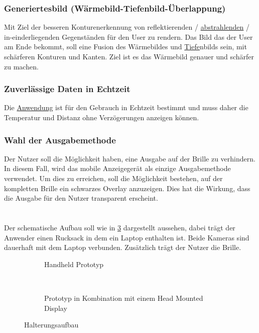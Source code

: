\subsubsection{Generiertesbild (Wärmebild-Tiefenbild-Überlappung)}
Mit Ziel der besseren Konturenerkennung von reflektierenden / \hyperlink{tab:strahlung}{abstrahlenden} / in-einderliegenden Gegenständen für den User zu rendern.
Das Bild das der User am Ende bekommt, soll eine Fusion des Wärmebildes und \hyperlink{tab:tiefe}{Tiefe}nbilds sein, mit schärferen Konturen und Kanten.
Ziel ist es das Wärmebild genauer und schärfer zu machen.

\subsubsection{Zuverlässige Daten in Echtzeit}
Die \hyperlink{tab:anwendung}{Anwendung} ist für den Gebrauch in Echtzeit bestimmt und muss daher die Temperatur und Distanz ohne Verzögerungen anzeigen können.

\subsubsection{Wahl der Ausgabemethode}
Der Nutzer soll die Möglichkeit haben, eine Ausgabe auf der Brille zu verhindern.
In diesem Fall, wird das mobile Anzeigegerät als einzige Ausgabemethode verwendet.
Um dies zu erreichen, soll die Möglichkeit bestehen, auf der kompletten Brille ein schwarzes Overlay anzuzeigen.
Dies hat die Wirkung, dass die Ausgabe für den Nutzer transparent erscheint.

\section{\setup}
\label{chap:spezi_setup}

Der schematische Aufbau soll wie in \cref{fig:spezi_halterung} dargestellt aussehen, dabei trägt der Anwender einen Rucksack in dem ein Laptop enthalten ist.
Beide Kameras sind dauerhaft mit dem Laptop verbunden.
Zusätzlich trägt der Nutzer die \meta Brille.
\begin{figure}[b]
	\centering
	\begin{subfigure}[t]{0.45\textwidth}
		\centering
		\caption{Handheld Prototyp}
		\label{fig:spezi_halterung_hand}
	\end{subfigure}
	~
	\begin{subfigure}[t]{0.45\textwidth}
		\centering
		\caption{Prototyp in Kombination mit einem Head Mounted Display}
		\label{fig:spezi_halterung_hmd}
	\end{subfigure}
	\caption{Halterungsaufbau}
	\label{fig:spezi_halterung}
\end{figure}

